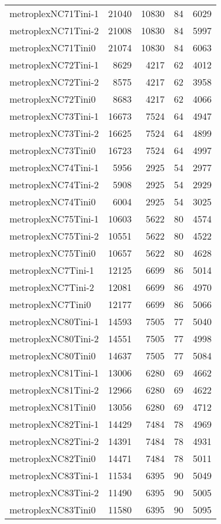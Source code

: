 \begin{longtable}{lrrrr}
metroplexNC71Tini-1 & 21040 & 10830 & 84 & 6029 \\
metroplexNC71Tini-2 & 21008 & 10830 & 84 & 5997 \\
metroplexNC71Tini0 & 21074 & 10830 & 84 & 6063 \\
metroplexNC72Tini-1 & 8629 & 4217 & 62 & 4012 \\
metroplexNC72Tini-2 & 8575 & 4217 & 62 & 3958 \\
metroplexNC72Tini0 & 8683 & 4217 & 62 & 4066 \\
metroplexNC73Tini-1 & 16673 & 7524 & 64 & 4947 \\
metroplexNC73Tini-2 & 16625 & 7524 & 64 & 4899 \\
metroplexNC73Tini0 & 16723 & 7524 & 64 & 4997 \\
metroplexNC74Tini-1 & 5956 & 2925 & 54 & 2977 \\
metroplexNC74Tini-2 & 5908 & 2925 & 54 & 2929 \\
metroplexNC74Tini0 & 6004 & 2925 & 54 & 3025 \\
metroplexNC75Tini-1 & 10603 & 5622 & 80 & 4574 \\
metroplexNC75Tini-2 & 10551 & 5622 & 80 & 4522 \\
metroplexNC75Tini0 & 10657 & 5622 & 80 & 4628 \\
metroplexNC7Tini-1 & 12125 & 6699 & 86 & 5014 \\
metroplexNC7Tini-2 & 12081 & 6699 & 86 & 4970 \\
metroplexNC7Tini0 & 12177 & 6699 & 86 & 5066 \\
metroplexNC80Tini-1 & 14593 & 7505 & 77 & 5040 \\
metroplexNC80Tini-2 & 14551 & 7505 & 77 & 4998 \\
metroplexNC80Tini0 & 14637 & 7505 & 77 & 5084 \\
metroplexNC81Tini-1 & 13006 & 6280 & 69 & 4662 \\
metroplexNC81Tini-2 & 12966 & 6280 & 69 & 4622 \\
metroplexNC81Tini0 & 13056 & 6280 & 69 & 4712 \\
metroplexNC82Tini-1 & 14429 & 7484 & 78 & 4969 \\
metroplexNC82Tini-2 & 14391 & 7484 & 78 & 4931 \\
metroplexNC82Tini0 & 14471 & 7484 & 78 & 5011 \\
metroplexNC83Tini-1 & 11534 & 6395 & 90 & 5049 \\
metroplexNC83Tini-2 & 11490 & 6395 & 90 & 5005 \\
metroplexNC83Tini0 & 11580 & 6395 & 90 & 5095 \\

\end{longtable}

